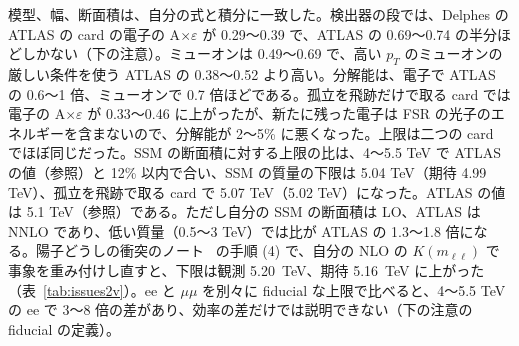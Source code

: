\documentclass[a4paper,10pt]{ltjsarticle}
\begin{document}
模型、幅、断面積は、自分の式と積分に一致した。検出器の段では、Delphes の ATLAS の card の電子の A$\times\varepsilon$ が 0.29〜0.39 で、ATLAS の 0.69〜0.74 の半分ほどしかない（下の注意）。ミューオンは 0.49〜0.69 で、高い $p_T$ のミューオンの厳しい条件を使う ATLAS の 0.38〜0.52 より高い。分解能は、電子で ATLAS の 0.6〜1 倍、ミューオンで 0.7 倍ほどである。孤立を飛跡だけで取る card では電子の A$\times\varepsilon$ が 0.33〜0.46 に上がったが、新たに残った電子は FSR の光子のエネルギーを含まないので、分解能が 2〜5\% に悪くなった。上限は二つの card でほぼ同じだった。SSM の断面積に対する上限の比は、4〜5.5 TeV で ATLAS の値（参照）と 12\% 以内で合い、SSM の質量の下限は 5.04 TeV（期待 4.99 TeV）、孤立を飛跡で取る card で 5.07 TeV（5.02 TeV）になった。ATLAS の値は 5.1 TeV（参照）である。ただし自分の SSM の断面積は LO、ATLAS は NNLO であり、低い質量（0.5〜3 TeV）では比が ATLAS の 1.3〜1.8 倍になる。陽子どうしの衝突のノート~\cite{ppnote} の手順 (4) で、自分の NLO の $K(m_{\ell\ell})$ で事象を重み付けし直すと、下限は観測 5.20~TeV、期待 5.16~TeV に上がった（表~\ref{tab:issues2v}）。ee と $\mu\mu$ を別々に fiducial な上限で比べると、4〜5.5 TeV の ee で 3〜8 倍の差があり、効率の差だけでは説明できない（下の注意の fiducial の定義）。
\end{document}
